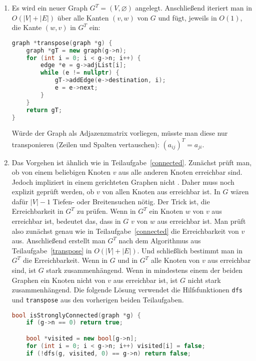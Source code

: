 \documentclass[11pt,a4paper]{article}
\begin{document}
\begin{loesung}
\begin{enumerate}
        \item
        Es wird ein neuer Graph $G^T = (V, \varnothing)$ angelegt.
        Anschließend iteriert man in $O(|V| + |E|)$ über alle Kanten $(v, w)$ von $G$ und fügt, jeweils in $O(1)$, die Kante $(w, v)$ in $G^T$ ein:
        \begin{lstlisting}[language=c++]
graph *transpose(graph *g) {
    graph *gT = new graph(g->n);
    for (int i = 0; i < g->n; i++) {
        edge *e = g->adjList[i];
        while (e != nullptr) {
            gT->addEdge(e->destination, i);
            e = e->next;
        }
    }
    return gT;
}
        \end{lstlisting}
        Würde der Graph als Adjazenzmatrix vorliegen, müsste man diese nur transponieren (Zeilen und Spalten vertauschen): $(a_{ij})^T = a_{ji}$.

        \item
        Das Vorgehen ist ähnlich wie in Teilaufgabe~\ref*{connected}.
        Zunächst prüft man, ob von einem beliebigen Knoten $v$ aus alle anderen Knoten erreichbar sind.
        Jedoch impliziert  in einem gerichteten Graphen nicht .
        Daher muss noch explizit geprüft werden, ob $v$ von allen Knoten aus erreichbar ist.
        In $G$ wären dafür $|V| - 1$ Tiefen- oder Breitensuchen nötig.
        Der Trick ist, die Erreichbarkeit in $G^T$ zu prüfen.
        Wenn in $G^T$ ein Knoten $w$ von $v$ aus erreichbar ist, bedeutet das, dass in $G$ $v$ von $w$ aus erreichbar ist.
        Man prüft also zunächst genau wie in Teilaufgabe~\ref*{connected} die Erreichbarkeit von $v$ aus. 
        Anschließend erstellt man $G^T$ nach dem Algorithmus aus Teilaufgabe~\ref*{transpose} in $O(|V| + |E|)$.
        Und schließlich bestimmt man in $G^T$ die Erreichbarkeit.
        Wenn in $G$ und in $G^T$ alle Knoten von $v$ aus erreichbar sind, ist $G$ stark zusammenhängend.
        Wenn in mindestens einem der beiden Graphen ein Knoten nicht von $v$ aus erreichbar ist, ist $G$ nicht stark zusammenhängend.
        Die folgende Lösung verwendet die Hilfsfunktionen \texttt{dfs} und \texttt{transpose} aus den vorherigen beiden Teilaufgaben.
        \begin{lstlisting}[language=c++]
bool isStronglyConnected(graph *g) {
    if (g->n == 0) return true;

    bool *visited = new bool[g->n];
    for (int i = 0; i < g->n; i++) visited[i] = false;
    if (!dfs(g, visited, 0) == g->n) return false;


\end{lstlisting}
\end{enumerate}
\end{loesung}
\end{document}
